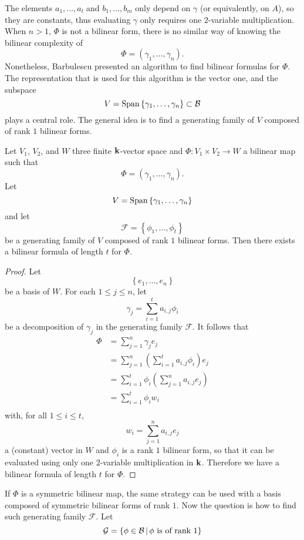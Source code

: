The elements $a_1, \dots, a_l$ and $b_1, \dots, b_m$ only depend on $\gamma$ (or
equivalently, on $A$), so they are constants, thus evaluating $\gamma$ only
requires one $2$-variable multiplication.
When $n>1$, \ie $\Phi$ is not a
bilinear form, there is no similar way of knowing the bilinear complexity of
\[
  \Phi = (\gamma_1, \dots, \gamma_n).
\]
Nonetheless, Barbulescu \etal presented an algorithm to find bilinear formulas
for $\Phi$. The representation that is used for this algorithm is the vector
one, and the subspace
\[
  V = \operatorname{Span}\left\{ \gamma_1, \dots, \gamma_n \right\}\subset\mathcal{B}
\]
plays a central role. The general idea is to find a generating family of $V$ composed of
rank $1$ bilinear forms.
\begin{prop}
  Let $V_1$, $V_2$, and $W$ three finite $\mathbf{k}$-vector space and $\Phi:V_1\times
  V_2\to W$ a bilinear map such that
  \[
    \Phi = (\gamma_1, \dots, \gamma_n).
  \]
  Let 
  \[
    V = \operatorname{Span}\left\{ \gamma_1, \dots, \gamma_n \right\}
  \]
  and let 
  \[
    \mathcal F = \left\{ \phi_1, \dots, \phi_t \right\}
  \]
  be a generating family of $V$ composed of rank $1$ bilinear forms. Then there
  exists a bilinear formula of length $t$ for $\Phi$.
\end{prop}
\begin{proof}
 Let 
 \[
   \left\{ e_1, \dots, e_n \right\}
 \]
 be a basis of $W$.  For each $1\leq j \leq n$, let
 \[
   \gamma_j = \sum_{i=1}^t a_{i, j} \phi_i
 \]
 be a decomposition of $\gamma_j$ in the generating family $\mathcal F$.
 It follows that
 \begin{align*}
   \Phi &= \sum_{j=1}^n\gamma_j e_j \\
   &= \sum_{j=1}^n (\sum_{i=1}^ta_{i, j}\phi_i)e_j\\
   &= \sum_{i=1}^t \phi_i (\sum_{j=1}^n a_{i, j}e_j)\\
   &= \sum_{i=1}^t \phi_i w_i\\
 \end{align*}
 with, for all $1\leq i\leq t$,
\[
  w_i = \sum_{j=1}^n a_{i, j}e_j
\]
a (constant) vector in $W$ and $\phi_i$ is a rank $1$ bilinear form, so that
it can be evaluated using only one $2$-variable multiplication in $\mathbf{k}$. Therefore
we have a bilinear formula of length $t$ for $\Phi$.
\end{proof}
If $\Phi$ is a symmetric bilinear map, the same strategy can be used with a
basis composed of symmetric bilinear forms of rank $1$. Now the question is how
to find such generating family $\mathcal F$. Let 
\[
  \mathcal{G} = \left\{ \phi\in\mathcal{B}\,|\,\phi\text{ is of rank }1 \right\}
\]
